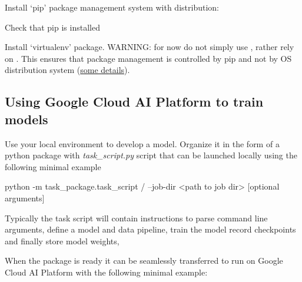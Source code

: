 \documentclass[12pt]{article}
\begin{document}
Install `pip' package management system with distribution:

Check that pip is installed

Install `virtualenv' package. WARNING: for now do not simply use , rather rely on . This ensures that package management is controlled by pip and not by OS distribution system (\href{https://github.com/pypa/pip/issues/5599}{some details}).

\subsection{Using Google Cloud AI Platform to train models}
Use your local environment to develop a model. Organize it in the form of a python package with \emph{task\_script.py} script that can be launched locally using the following minimal example

\begin{bash}
python -m task_package.task_script /
  --job-dir <path to job dir> [optional arguments]
\end{bash}

Typically the task script will contain instructions to parse command line arguments, define a model and data pipeline, train the model record checkpoints and finally store model weights,

When the package is ready it can be seamlessly transferred to run on Google Cloud AI Platform with the following minimal example:
\end{document}
